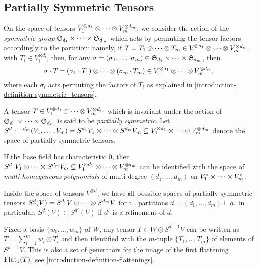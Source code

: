 \subsection{Partially Symmetric Tensors}
\label{introduction-subsection-partially_symmetric_tensors}

On the space of tensors $V_1^{\otimes d_1}\otimes \cdots \otimes V_m^{\otimes d_m}$, we consider the action of the \emph{symmetric group} $\mathfrak{S}_{d_1} \times \cdots \times \mathfrak{S}_{d_m}$ which acts by permuting the tensor factors accordingly to the partition: namely, if $T = T_1 \otimes \cdots \otimes T_m \in V_1^{\otimes d_1}\otimes \cdots \otimes V_m^{\otimes d_m}$, with $T_i \in V_i^{\otimes d_i}$, then, for any $\sigma = (\sigma_1,\ldots,\sigma_m)\in \mathfrak{S}_{d_1} \times \cdots \times \mathfrak{S}_{d_m}$, then \[\sigma \cdot T = (\sigma_1\cdot T_1) \otimes \cdots \otimes (\sigma_m\cdot T_m) \in V_1^{\otimes d_1}\otimes \cdots \otimes V_m^{\otimes d_m},\] where each $\sigma_i$ acts permuting the factors of $T_i$ as explained in \ref{introduction-definition-symmetric_tensors}.
\begin{definition}
    \label{introduction-definition-partially_symmetric_tensors}
    
    A tensor $T \in V_1^{\otimes d_1}\otimes \cdots \otimes V_m^{\otimes d_m}$ which is invariant under the action of $\mathfrak{S}_{d_1} \times \cdots \times \mathfrak{S}_{d_m}$ is said to be \emph{partially symmetric}. Let $S^{d_1,\ldots,d_m}(V_1,\ldots,V_m) = S^{d_1} V_1 \otimes \cdots \otimes S^{d_m}V_m \subseteq V_1^{\otimes d_1}\otimes \cdots \otimes V_m^{\otimes d_m}$ denote the space of partially symmetric tensors. 

    If the base field has characteristic $0$, then $S^{d_1} V_1 \otimes \cdots \otimes S^{d_m}V_m \subseteq V_1^{\otimes d_1}\otimes \cdots \otimes V_m^{\otimes d_m}$ can be identified with the space of \emph{multi-homogeneous polynomials} of multi-degree $(d_1,\ldots,d_m)$ on $V^*_1 \times \cdots \times V^*_m$. 
\end{definition}

Inside the space of tensors $V^{\otimes d}$, we have all possible spaces of partially symmetric tensors $S^{\underline{d}}(V) = S^{d_1} V \otimes \cdots \otimes S^{d_m}V$ for all partitions $\underline{d} = (d_1,\ldots,d_m)\vdash d$. In particular, $S^{\underline{d}}(V) \subset S^{\underline{d'}}(V)$ if $\underline{d}'$ is a refinement of $\underline{d}$.

Fixed a basis $\{w_0,\ldots,w_m\}$ of $W$, any tensor $T \in W \otimes S^{d-1} V$ can be written as $T = \sum_{i=1}^m w_i \otimes T_i$ and then identified with the $m$-tuple $\{T_1,\ldots,T_m\}$ of elements of $S^{d-1} V$. This is also a set of generators for the image of the first flattening $\mathrm{Flat}_1(T)$, see \ref{introduction-definition-flattenings}.

